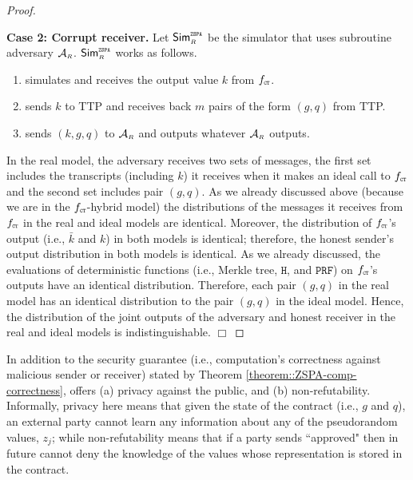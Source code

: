 \begin{proof}
\


\noindent\textbf{Case 2: Corrupt receiver.}   Let $\mathsf{Sim}^{\scriptscriptstyle \mathtt{ZSPA}}_{\scriptscriptstyle R}$ be the simulator that uses subroutine adversary $\mathcal{A}_{\scriptscriptstyle R}$. $\mathsf{Sim}^{\scriptscriptstyle \mathtt{ZSPA}}_{\scriptscriptstyle R}$ works as follows. 

\begin{enumerate}
%
\item simulates   \ct  and receives the output value $ k$ from $f_{\scriptscriptstyle \mathtt{CT}}$.
%
\item sends $ k$ to TTP and receives back $m$ pairs of the form $( g,  q)$ from TTP. 
%
\item sends $( k,  g,  q)$ to $\mathcal{A}_{\scriptscriptstyle R}$ and outputs whatever  $\mathcal{A}_{\scriptscriptstyle R}$ outputs. 
%
 \end{enumerate}
 
 
In the real model, the adversary receives two sets of messages, the first set includes the transcripts (including $ k$) it receives when it makes an ideal call to $f_{\scriptscriptstyle \mathtt{CT}}$ and the second set includes pair $(g, q)$. As we already discussed above (because we are in the  $f_{\scriptscriptstyle \mathtt{CT}}$-hybrid model) the distributions of the messages it receives from $f_{\scriptscriptstyle \mathtt{CT}}$ in the real and ideal models are identical. Moreover, the distribution of $f_{\scriptscriptstyle \mathtt{CT}}$'s output (i.e., $\bar k$ and $k$) in both models is identical; therefore, the honest sender's output distribution in both models is identical. As we already discussed,  the evaluations of deterministic functions (i.e., Merkle tree, $\mathtt{H}$, and $\mathtt{PRF}$) on $f_{\scriptscriptstyle \mathtt{CT}}$'s outputs have an identical distribution. Therefore, each pair $(g, q)$ in the real model has an identical distribution to the pair $(g, q)$ in the ideal model.  Hence, the distribution of the joint outputs of the adversary and honest receiver in the real and ideal models is indistinguishable.
%
  \hfill\(\Box\)\end{proof}

In addition to the security guarantee (i.e., computation's correctness against malicious sender or receiver) stated by Theorem \ref{theorem::ZSPA-comp-correctness}, \zspa offers  (a) privacy against the public, and (b)  non-refutability. Informally, privacy here means that given the state of the contract (i.e., $g$ and  $q$), an external party cannot learn any information about any of the pseudorandom values,  $z_{\scriptscriptstyle j}$; while non-refutability means that if a party sends ``approved" then in future cannot deny the knowledge of the values whose representation is stored in the contract. %



